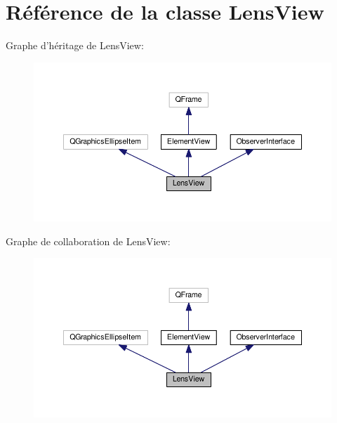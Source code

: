 \hypertarget{classLensView}{\section{Référence de la classe Lens\+View}
\label{classLensView}
}


Graphe d'héritage de Lens\+View\+:\nopagebreak
\begin{figure}[H]
\begin{center}
\leavevmode
\includegraphics[width=350pt]{d3/d0e/classLensView__inherit__graph}
\end{center}
\end{figure}


Graphe de collaboration de Lens\+View\+:\nopagebreak
\begin{figure}[H]
\begin{center}
\leavevmode
\includegraphics[width=350pt]{d3/d32/classLensView__coll__graph}
\end{center}
\end{figure}
